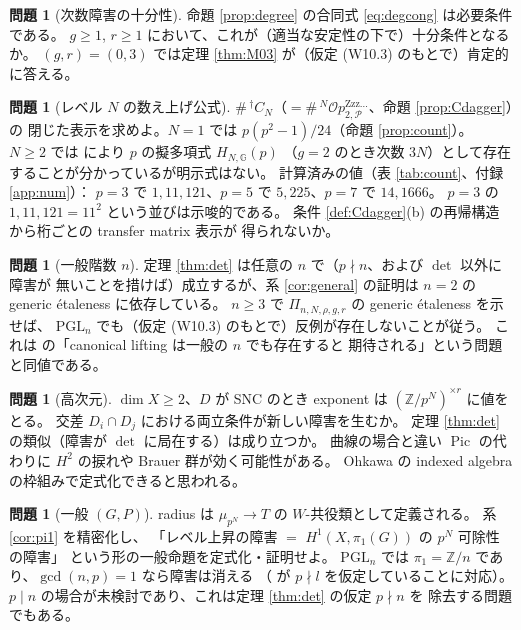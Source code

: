 \documentclass[a4paper,11pt]{ltjsarticle}
\theoremstyle{plain}
\theoremstyle{definition}
\newtheorem{question}[theorem]{問題}
\newcommand{\bbZ}{\mathbb{Z}}
\newcommand{\sP}{\mathscr{P}}
\newcommand{\Pic}{\operatorname{Pic}}
\newcommand{\Op}{\mathcal{O}p}
\newcommand{\Zzz}{\mathrm{Zzz\dots}}
\begin{document}
\begin{question}[次数障害の十分性]\label{q:degree-suff}
命題 \ref{prop:degree} の合同式 \eqref{eq:degcong} は必要条件である。
$g\ge1$, $r\ge1$ において、これが（適当な安定性の下で）十分条件となるか。
$(g,r)=(0,3)$ では定理 \ref{thm:M03} が（仮定 (W10.3) のもとで）肯定的に答える。
\end{question}

\begin{question}[レベル $N$ の数え上げ公式]\label{q:count}
$\#\,{}^{\dagger}C_N$（$=\#\,{}^N\Op^{\Zzz}_{2,\sP}$、命題 \ref{prop:Cdagger}）の
閉じた表示を求めよ。$N=1$ では $p(p^2-1)/24$（命題 \ref{prop:count}）。
$N\ge2$ では \cite[Thm.~E]{Wak2} により $p$ の擬多項式 $H_{N,\mathbb{G}}(p)$
（$g=2$ のとき次数 $3N$）として存在することが分かっているが明示式はない。
計算済みの値（表 \ref{tab:count}、付録 \ref{app:num}）：
$p=3$ で $1,11,121$、$p=5$ で $5,225$、$p=7$ で $14,1666$。
$p=3$ の $1,11,121=11^2$ という並びは示唆的である。
条件 \ref{def:Cdagger}(b) の再帰構造から桁ごとの transfer matrix 表示が
得られないか。
\end{question}

\begin{question}[一般階数 $n$]\label{q:rank}
定理 \ref{thm:det} は任意の $n$ で（$p\nmid n$、および $\det$ 以外に障害が
無いことを措けば）成立するが、系 \ref{cor:general} の証明は $n=2$ の
generic étaleness \cite[Thm.~C]{Wak2} に依存している。
$n\ge3$ で $\Pi_{n,N,\rho,g,r}$ の generic étaleness を示せば、
$\mathrm{PGL}_n$ でも（仮定 (W10.3) のもとで）反例が存在しないことが従う。
これは \cite[\S1.6]{Wak2} の「canonical lifting は一般の $n$ でも存在すると
期待される」という問題と同値である。
\end{question}

\begin{question}[高次元]\label{q:higherdim}
$\dim X\ge2$、$D$ が SNC のとき exponent は $(\bbZ/p^N)^{\times r}$ に値をとる。
交差 $D_i\cap D_j$ における両立条件が新しい障害を生むか。
定理 \ref{thm:det} の類似（障害が $\det$ に局在する）は成り立つか。
曲線の場合と違い $\Pic$ の代わりに $H^2$ の捩れや Brauer 群が効く可能性がある。
Ohkawa の indexed algebra の枠組みで定式化できると思われる。
\end{question}

\begin{question}[一般 $(G,P)$]\label{q:GP}
radius は $\mu_{p^N}\to T$ の $W$-共役類として定義される。
系 \ref{cor:pi1} を精密化し、
「レベル上昇の障害 $=$ $H^1(X,\pi_1(G))$ の $p^N$ 可除性の障害」
という形の一般命題を定式化・証明せよ。
$\mathrm{PGL}_n$ では $\pi_1=\bbZ/n$ であり、$\gcd(n,p)=1$ なら障害は消える
（\cite[Prop.~4.1.4]{Wak} が $p\nmid l$ を仮定していることに対応）。
$p\mid n$ の場合が未検討であり、これは定理 \ref{thm:det} の仮定 $p\nmid n$ を
除去する問題でもある。
\end{question}
\end{document}
